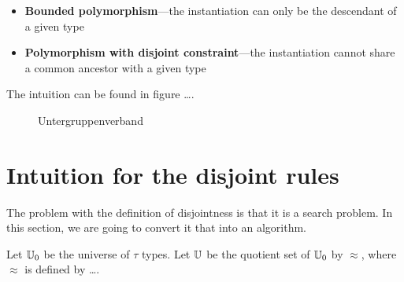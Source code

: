 \documentclass[nocopyrightspace,preprint,times,9pt]{sigplanconf}
\begin{document}
\begin{itemize}
  \item \textbf{Bounded polymorphism}---the instantiation can only be the descendant of a given type
  \item \textbf{Polymorphism with disjoint constraint}---the instantiation cannot share a common ancestor with a given type
\end{itemize}

The intuition can be found in figure \ldots.

\begin{figure}

\centering
\newcommand{\mydistance}{.6cm}
\caption{Untergruppenverband}
\end{figure}

\section{Intuition for the disjoint rules}

The problem with the definition of disjointness is that it is a search problem. In this section, we are going to convert it that into an algorithm.

Let $\mathbb{U}_0$ be the universe of $\tau$ types. Let $\mathbb{U}$ be the quotient set of $\mathbb{U}_0$ by $\approx$, where $\approx$ is defined by \ldots.
\end{document}
